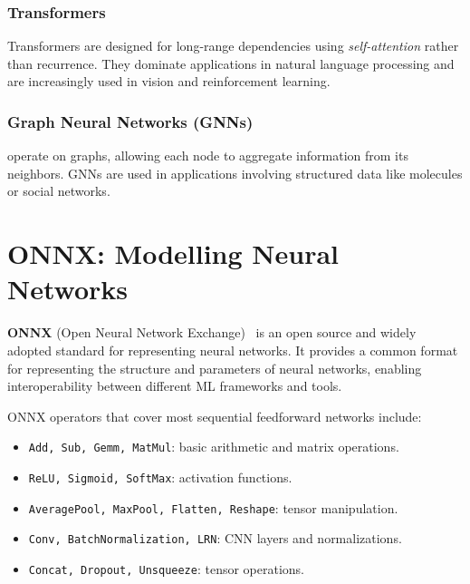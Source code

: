 \documentclass[oneside,11pt,dvipsnames]{book}
\numberwithin{equation}{section}
\theoremstyle{definition}
\theoremstyle{remark}
\begin{document}
\subsubsection{Transformers} Transformers are designed for long-range dependencies using \emph{self-attention} rather than recurrence. They dominate applications in natural language processing and are increasingly used in vision and reinforcement learning.

\subsubsection{Graph Neural Networks (GNNs)} operate on graphs, allowing each node to aggregate information from its neighbors. GNNs are used in applications involving structured data like molecules or social networks.



\section{ONNX: Modelling Neural Networks}\label{sec:onnx}

\textbf{ONNX} (Open Neural Network Exchange)~\cite{onnx} is an open source and widely adopted standard for representing neural networks. It provides a common format for representing the structure and parameters of neural networks, enabling interoperability between different ML frameworks and tools.



ONNX operators that cover most sequential feedforward networks include:
\begin{itemize}
    \item \texttt{Add, Sub, Gemm, MatMul}: basic arithmetic and matrix operations.
    \item \texttt{ReLU, Sigmoid, SoftMax}: activation functions.
    \item \texttt{AveragePool, MaxPool, Flatten, Reshape}: tensor manipulation.
    \item \texttt{Conv, BatchNormalization, LRN}: CNN layers and normalizations.
    \item \texttt{Concat, Dropout, Unsqueeze}: tensor operations.
\end{itemize}
\end{document}
